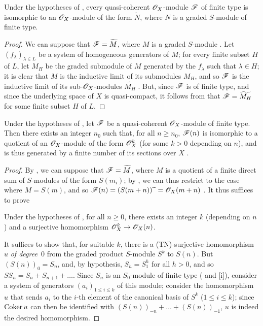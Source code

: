 \begin{corollary}[2.7.8]
\label{II.2.7.8}
Under the hypotheses of , every quasi-coherent $\mathscr{O}_X$-module $\mathscr{F}$ of finite type is isomorphic to an $\mathscr{O}_X$-module of the form $\widetilde{N}$, where $N$ is a graded $S$-module of finite type.
\end{corollary}

\begin{proof}
We can suppose that $\mathscr{F}=\widetilde{M}$, where $M$ is a graded $S$-module .
Let $(f_\lambda)_{\lambda\in L}$ be a system of homogeneous generators of $M$;
for every finite subset $H$ of $L$, let $M_H$ be the graded submodule of $M$ generated by the $f_\lambda$ such that $\lambda\in H$;
it is clear that $M$ is the inductive limit of its submodules $M_H$, and so $\mathscr{F}$ is the inductive limit of its sub-$\mathscr{O}_X$-modules $\widetilde{M_H}$ .
But, since $\mathscr{F}$ is of finite type, and since the underlying space of $X$ is quasi-compact, it follows from  that $\mathscr{F}=\widetilde{M_H}$ for some finite subset $H$ of $L$.
\end{proof}

\begin{corollary}[2.7.9]
\label{II.2.7.9}
Under the hypotheses of , let $\mathscr{F}$ be a quasi-coherent $\mathscr{O}_X$-module of finite type.
Then there exists an integer $n_0$ such that, for all $n\geq n_0$, $\mathscr{F}(n)$ is isomorphic to a quotient of an $\mathscr{O}_X$-module of the form $\mathscr{O}_X^k$ (for some $k>0$ depending on $n$), and is thus generated by a finite number of its sections over $X$ .
\end{corollary}

\begin{proof}
By , we can suppose that $\mathscr{F}=\widetilde{M}$, where $M$ is a quotient of a finite direct sum of $S$-modules of the form $S(m_i)$;
by , we can thus restrict to the case where $M=S(m)$, and so $\mathscr{F}(n)=(S(m+n)){\,\widetilde{\,}\,}=\mathscr{O}_X(m+n)$ .
It thus suffices to prove

  \begin{lemma}[2.7.9.1]
  \label{II.2.7.9.1}
  Under the hypotheses of , for all $n\geq0$, there exists an integer $k$ (depending on $n$) and a surjective homomorphism $\sh{O}_X^k\to\sh{O}_X(n)$.
  \end{lemma}

It suffices  to show that, for suitable $k$, there is a (TN)-surjective homomorphism $u$ \emph{of degree~$0$} from the graded product $S$-module $S^k$ to $S(n)$.
But $(S(n))_0=S_n$, and, by hypothesis, $S_h=S_1^h$ for all $h>0$, and so $SS_n=S_n+S_{n+1}+\ldots$.
Since $S_n$ is an $S_0$-module of finite type ( and [i]), consider a system of generators $(a_i)_{1\leq i\leq k}$ of this module;
consider the homomorphism $u$ that sends $a_i$ to the $i$-th element of the canonical basis of $S^k$ ($1\leq i\leq k$);
since $\operatorname{Coker} u$ can then be identified with $(S(n))_{-n}+\ldots+(S(n))_{-1}$, $u$ is indeed the desired homomorphism.
\end{proof}

